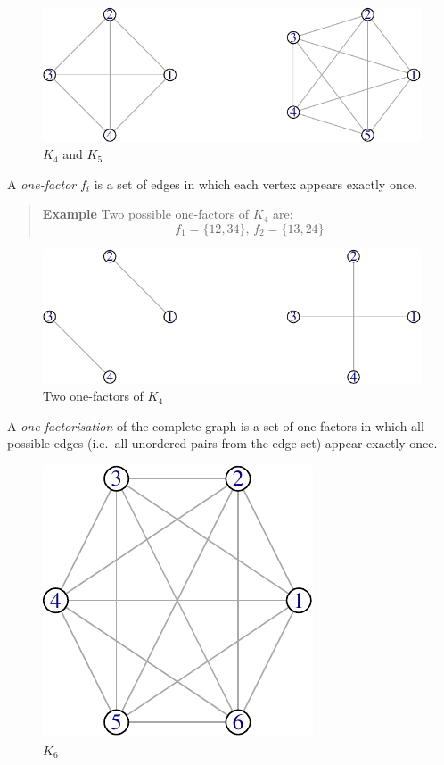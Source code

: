 \documentclass[
  11pt,
  a4paper]{book}
\newcounter{examplecounter}
\begin{document}
\begin{figure}
\centering
\includegraphics{figure/complete-graph-1.pdf}
\caption{\label{fig:complete-graph}\(K_4\) and \(K_5\)}
\end{figure}

A \emph{one-factor} \(f_i\) is a set of edges in which each vertex
appears exactly once.

\begin{quote}  \textbf{Example } \quad 
Two possible one-factors of $K_4$ are:
$$f_1 = \{12,34\},\, f_2 = \{13,24\}$$
 \end{quote}

\begin{figure}
\centering
\includegraphics{figure/two-one-factors-1.pdf}
\caption{\label{fig:two-one-factors}Two one-factors of \(K_{4}\)}
\end{figure}

A \emph{one-factorisation} of the complete graph is a set of
one-factors in which all possible edges (i.e.~all unordered
pairs from the edge-set) appear exactly once.

\begin{figure}
\centering
\includegraphics{figure/K6-1.pdf}
\caption{\label{fig:K6}\(K_6\)}
\end{figure}
\end{document}

